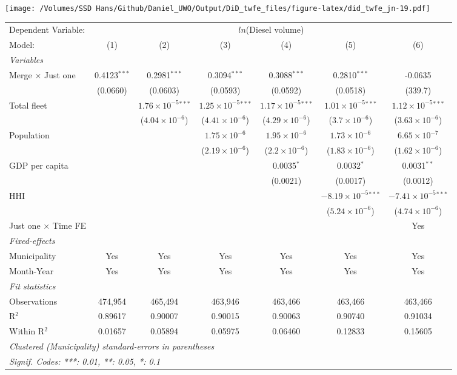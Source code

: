 \documentclass[
]{article}
\begin{document}
\texttt{[image: /Volumes/SSD Hans/Github/Daniel\_UWO/Output/DiD\_twfe\_files/figure-latex/did\_twfe\_jn-19.pdf]}

\begin{tabular}{lcccccc}
\tabularnewline\midrule\midrule
Dependent Variable:&\multicolumn{6}{c}{$ln$(Diesel volume)}\\
Model:&(1) & (2) & (3) & (4) & (5) & (6)\\
\midrule \emph{Variables}&   &   &   &   &   &  \\
Merge $\times $ Just one & 0.4123$^{***}$ & 0.2981$^{***}$ & 0.3094$^{***}$ & 0.3088$^{***}$ & 0.2810$^{***}$ & -0.0635\\
  &(0.0660) & (0.0603) & (0.0593) & (0.0592) & (0.0518) & (339.7)\\
Total fleet &    & $1.76\times 10^{-5}$$^{***}$ & $1.25\times 10^{-5}$$^{***}$ & $1.17\times 10^{-5}$$^{***}$ & $1.01\times 10^{-5}$$^{***}$ & $1.12\times 10^{-5}$$^{***}$\\
  &   & ($4.04\times 10^{-6}$) & ($4.41\times 10^{-6}$) & ($4.29\times 10^{-6}$) & ($3.7\times 10^{-6}$) & ($3.63\times 10^{-6}$)\\
Population &    &    & $1.75\times 10^{-6}$ & $1.95\times 10^{-6}$ & $1.73\times 10^{-6}$ & $6.65\times 10^{-7}$\\
  &   &    & ($2.19\times 10^{-6}$) & ($2.2\times 10^{-6}$) & ($1.83\times 10^{-6}$) & ($1.62\times 10^{-6}$)\\
GDP per capita &    &    &    & 0.0035$^{*}$ & 0.0032$^{*}$ & 0.0031$^{**}$\\
  &   &    &    & (0.0021) & (0.0017) & (0.0012)\\
HHI &    &    &    &    & $-8.19\times 10^{-5}$$^{***}$ & $-7.41\times 10^{-5}$$^{***}$\\
  &   &    &    &    & ($5.24\times 10^{-6}$) & ($4.74\times 10^{-6}$)\\
Just one $\times$ Time FE &  &  &  &  &  & Yes\\
\midrule \emph{Fixed-effects}&   &   &   &   &   &  \\
Municipality & Yes & Yes & Yes & Yes & Yes & Yes\\
Month-Year & Yes & Yes & Yes & Yes & Yes & Yes\\
\midrule \emph{Fit statistics}&  & & & & & \\
Observations & 474,954&465,494&463,946&463,466&463,466&463,466\\
R$^2$ & 0.89617&0.90007&0.90015&0.90063&0.90740&0.91034\\
Within R$^2$ & 0.01657&0.05894&0.05975&0.06460&0.12833&0.15605\\
\midrule\midrule\multicolumn{7}{l}{\emph{Clustered (Municipality) standard-errors in parentheses}}\\
\multicolumn{7}{l}{\emph{Signif. Codes: ***: 0.01, **: 0.05, *: 0.1}}\\
\end{tabular}
\end{document}
